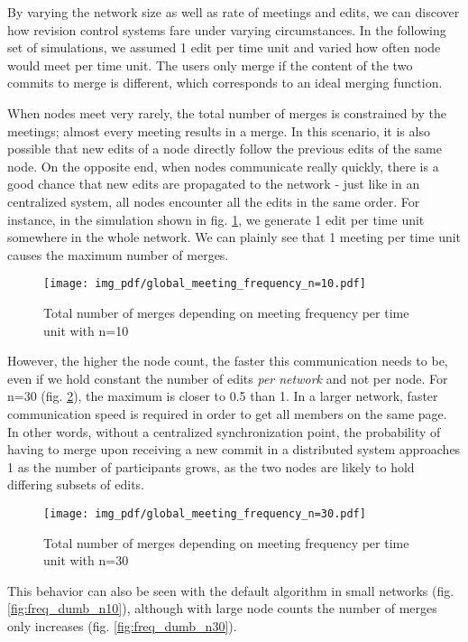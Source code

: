 \documentclass[conference,a4paper]{IEEEtran}
\begin{document}
By varying the network size as well as rate of meetings and edits, we can discover how revision control systems fare under varying circumstances. In the following set of simulations, we assumed 1 edit per time unit and varied how often node would meet per time unit. The users only merge if the content of the two commits to merge is different, which corresponds to an ideal merging function.

When nodes meet very rarely, the total number of merges is constrained by the meetings; almost every meeting results in a merge. In this scenario, it is also possible that new edits of a node directly follow the previous edits of the same node. On the opposite end, when nodes communicate really quickly, there is a good chance that new edits are propagated to the network - just like in an centralized system, all nodes encounter all the edits in the same order. For instance, in the simulation shown in fig. \ref{fig:freq_n10}, we generate 1 edit per time unit somewhere in the whole network. We can plainly see that 1 meeting per time unit causes the maximum number of merges.

\begin{figure}
  \texttt{[image: img\_pdf/global\_meeting\_frequency\_n=10.pdf]}
  \caption{Total number of merges depending on meeting frequency per time unit with n=10}
  \label{fig:freq_n10}
\end{figure}

However, the higher the node count, the faster this communication needs to be, even if we hold constant the number of edits \textit{per network} and not per node. For n=30 (fig. \ref{fig:freq_n30}), the maximum is closer to 0.5 than 1. In a larger network, faster communication speed is required in order to get all members on the same page. In other words, without a centralized synchronization point, the probability of having to merge upon receiving a new commit in a distributed system approaches 1 as the number of participants grows, as the two nodes are likely to hold differing subsets of edits.
\begin{figure}
  \texttt{[image: img\_pdf/global\_meeting\_frequency\_n=30.pdf]}
  \caption{Total number of merges depending on meeting frequency per time unit with n=30}
  \label{fig:freq_n30}
\end{figure}

This behavior can also be seen with the default algorithm in small networks (fig. \ref{fig:freq_dumb_n10}), although with large node counts the number of merges only increases (fig. \ref{fig:freq_dumb_n30}).
\end{document}

